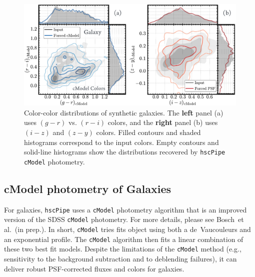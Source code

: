 \documentclass[useamsfonts]{pasj01}
\def\etal{{\ et al.~}}
\def\hscpipe{\texttt{hscPipe}}
\def\cmodel{\texttt{cModel}}
\begin{document}
\begin{figure}
    \begin{center}
        \includegraphics[width=\textwidth]{fig/synpipe_galaxy_cdist}
    \end{center}
    \caption{Color-color distributions of synthetic  galaxies.
        The \textbf{left} panel (a) uses $(g-r)$ vs. $(r-i)$ colors, and the 
        \textbf{right} panel (b) uses $(i-z)$ and $(z-y)$ colors. Filled contours and shaded histograms  correspond to the input colors. Empty contours and solid-line histograms show the distributions recovered
        by \hscpipe{} \cmodel{} photometry.
        }
    \label{fig:cmodel_cdist}
\end{figure}

\subsection{cModel photometry of Galaxies}
    \label{ssec:cmodel}

    For galaxies, \hscpipe{} uses a \cmodel{} photometry algorithm that is an improved 
    version of the SDSS \cmodel{} photometry.
    For more details, please see Bosch\etal (in prep.).
    In short, \cmodel{} tries fits object using both a de~Vaucouleurs and an exponential profile.  The \cmodel{} algorithm then fits a linear combination of these two best fit models. Despite the limitations of the \cmodel{} method (e.g., sensitivity to the background
    subtraction and to deblending failures), it can deliver robust PSF-corrected fluxes and
    colors for galaxies.
\end{document}
